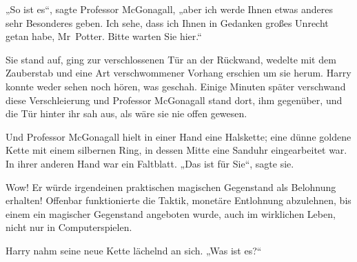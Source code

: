 „So ist es“, sagte Professor McGonagall, „aber ich werde Ihnen etwas anderes sehr Besonderes geben. Ich sehe, dass ich Ihnen in Gedanken großes Unrecht getan habe, Mr~Potter. Bitte warten Sie hier.“

Sie stand auf, ging zur verschlossenen Tür an der Rückwand, wedelte mit dem Zauberstab und eine Art verschwommener Vorhang erschien um sie herum. Harry konnte weder sehen noch hören, was geschah. Einige Minuten später verschwand diese Verschleierung und Professor McGonagall stand dort, ihm gegenüber, und die Tür hinter ihr sah aus, als wäre sie nie offen gewesen.

Und Professor McGonagall hielt in einer Hand eine Halskette; eine dünne goldene Kette mit einem silbernen Ring, in dessen Mitte eine Sanduhr eingearbeitet war. In ihrer anderen Hand war ein Faltblatt. „Das ist für Sie“, sagte sie.

Wow! Er würde irgendeinen praktischen magischen Gegenstand als Belohnung erhalten! Offenbar funktionierte die Taktik, monetäre Entlohnung abzulehnen, bis einem ein magischer Gegenstand angeboten wurde, auch im wirklichen Leben, nicht nur in Computerspielen.

Harry nahm seine neue Kette lächelnd an sich. „Was ist es?“

